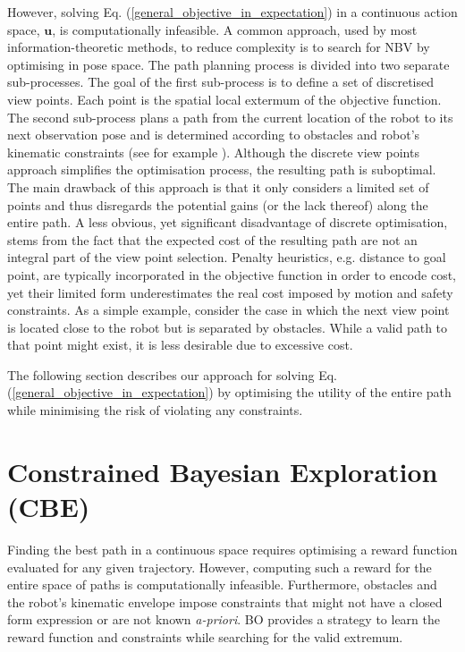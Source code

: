 \documentclass[shortAfour,sageh,times]{sagej_no_sage}
\begin{document}
However, solving Eq. (\ref{general_objective_in_expectation}) in a continuous action space, $\boldsymbol{u}$, is computationally infeasible. A common approach, used by most information-theoretic methods, to reduce complexity is to search for NBV by optimising in pose space. The path planning process is divided into two separate sub-processes. The goal of the first sub-process is to define a set of discretised view points. Each point is the spatial local extermum of the objective function. The second sub-process plans a path from the current location of the robot to its next observation pose and is determined according to obstacles and robot's kinematic constraints (see for example \citet{Makarenko2002, Kollar2008}). 
Although the discrete view points approach simplifies the optimisation process, the resulting path is suboptimal. The main drawback of this approach is that it only considers a limited set of points and thus disregards the potential gains (or the lack thereof) along the entire path. A less obvious, yet significant disadvantage of discrete optimisation, stems from the fact that the expected cost of the resulting path are not an integral part of the view point selection. Penalty heuristics, e.g. distance to goal point, are typically incorporated in the objective function in order to encode cost, yet their limited form underestimates the real cost imposed by motion and safety constraints. As a simple example, consider the case in which the next view point is located close to the robot but is separated by obstacles. While a valid path to that point might exist, it is less desirable due to excessive cost.  

The following section describes our approach for solving Eq. (\ref{general_objective_in_expectation}) by optimising the 
utility of the entire path while minimising the risk of violating any constraints.

\section{Constrained Bayesian Exploration (CBE)}
\label{sec:CBO}
Finding the best path in a continuous space requires optimising a reward function evaluated for any given trajectory. However, computing such a reward for the entire space of paths is computationally infeasible. Furthermore, obstacles and the robot's kinematic envelope impose 
constraints that might not have a closed form expression or are not known \textit{a-priori}. BO provides a strategy to 
learn the reward function and constraints while searching for the valid extremum.
\end{document}
